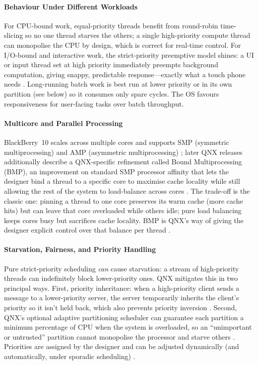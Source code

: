 \paragraph{Behaviour Under Different Workloads}

For CPU-bound work, equal-priority threads benefit from round-robin
time-slicing so no one thread starves the others; a single
high-priority compute thread can monopolise the CPU by design, which is
correct for real-time control. For I/O-bound and interactive work, the
strict-priority preemptive model shines: a UI or input thread set at
high priority immediately preempts background computation, giving
snappy, predictable response---exactly what a touch phone needs
\citep{crackberry_qnxhistory}. Long-running batch work is best run at
lower priority or in its own partition (see below) so it consumes only
spare cycles. The OS favours responsiveness for user-facing tasks over
batch throughput.

\paragraph{Multicore and Parallel Processing}

BlackBerry~10 scales across multiple cores and supports SMP (symmetric
multiprocessing) and AMP (asymmetric multiprocessing)
\citep{qnx_smp_multicore}; later QNX releases additionally describe a
QNX-specific refinement called Bound Multiprocessing (BMP), an
improvement on standard SMP processor affinity that lets the designer
bind a thread to a specific core to maximise cache locality while still
allowing the rest of the system to load-balance across cores
\citep{qnx_neutrino_overview}. The trade-off is the classic one: pinning a thread to one core
preserves its warm cache (more cache hits) but can leave that core
overloaded while others idle; pure load balancing keeps cores busy but
sacrifices cache locality. BMP is QNX's way of giving the designer
explicit control over that balance per thread \citep{qnx_neutrino_overview}.

\paragraph{Starvation, Fairness, and Priority Handling}

Pure strict-priority scheduling \emph{can} cause starvation: a stream of
high-priority threads can indefinitely block lower-priority ones. QNX
mitigates this in two principal ways. First, priority inheritance: when
a high-priority client sends a message to a lower-priority server, the
server temporarily inherits the client's priority so it isn't held
back, which also prevents priority inversion
\citep{qnx_ipc, qnx_kernel_sysarch}. Second, QNX's optional adaptive partitioning
scheduler can guarantee each partition a minimum percentage of CPU when
the system is overloaded, so an ``unimportant or untrusted'' partition
cannot monopolise the processor and starve others \citep{qnx_aps}.
Priorities are assigned by the designer and can be adjusted dynamically
(and automatically, under sporadic scheduling)
\citep{qnx_sched_policies}.

